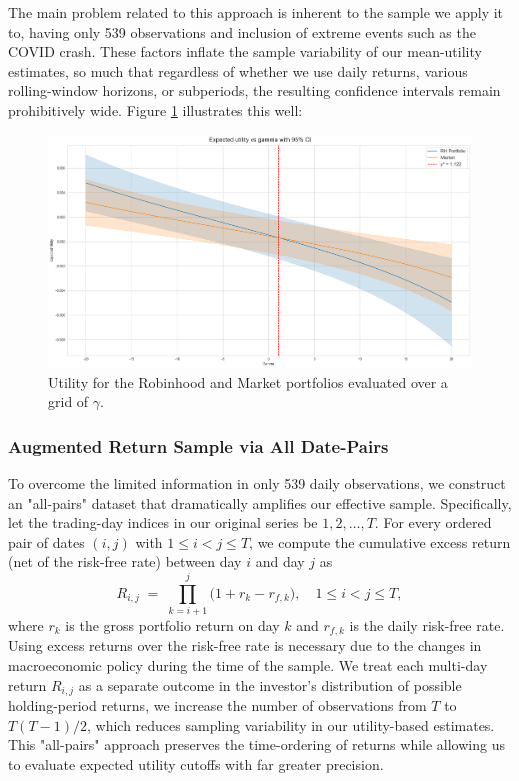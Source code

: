 The main problem related to this approach is inherent to the sample we apply it to, having only 539 observations and inclusion of extreme events such as the COVID crash. 
These factors inflate the sample variability of our mean-utility estimates, so much that regardless of whether we use daily returns, various rolling-window horizons, or subperiods, the resulting confidence intervals remain prohibitively wide.
Figure \ref{fig:cutoff} illustrates this well: 
\begin{figure}[h!]
    \centering
    \includegraphics[width=\linewidth]{../images/risk/cutoff_daily.png}
    \caption{Utility for the Robinhood and Market portfolios evaluated over a grid of $\gamma$.}
    \label{fig:cutoff}
\end{figure}

\subsubsection{Augmented Return Sample via All Date-Pairs}
\label{sec:allpairs}
To overcome the limited information in only 539 daily observations, we construct an "all-pairs" dataset that dramatically amplifies our effective sample.  
Specifically, let the trading-day indices in our original series be $1,2,\dots,T$.  
For every ordered pair of dates $(i,j)$ with $1 \le i < j \le T$, we compute the cumulative excess return (net of the risk-free rate) between day $i$ and day $j$ as
\begin{equation}
    R_{i,j}
    \;=\;
    \prod_{k=i+1}^{j}\bigl(1 + r_k - r_{f,k}\bigr),
    \quad
    1 \le i < j \le T,
    \label{eq:allpairs_return}
\end{equation}
where $r_k$ is the gross portfolio return on day $k$ and $r_{f,k}$ is the daily risk-free rate.  
Using excess returns over the risk-free rate is necessary due to the changes in macroeconomic policy during the time of the sample. 
We treat each multi-day return $R_{i,j}$ as a separate outcome in the investor's distribution of possible holding-period returns, we increase the number of observations from $T$ to $T(T-1)/2$, which reduces sampling variability in our utility-based estimates.  
This "all-pairs" approach preserves the time-ordering of returns while allowing us to evaluate expected utility cutoffs with far greater precision.  

